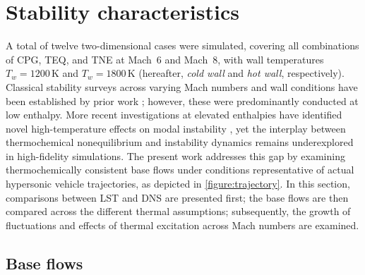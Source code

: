 \section{Stability characteristics}
A total of twelve two-dimensional cases were simulated, covering all combinations of \gls{CPG}, \gls{TEQ}, and \gls{TNE} at Mach~6 and Mach~8, with wall temperatures $T_w=1200\,\mathrm{K}$ and $T_w=1800\,\mathrm{K}$ (hereafter, \emph{cold wall} and \emph{hot wall}, respectively). Classical stability surveys across varying Mach numbers and wall conditions have been established by prior work \citep{Mack1969,Mack1984,Malik1989,MasadEtAl1992}; however, these were predominantly conducted at low enthalpy. More recent investigations at elevated enthalpies have identified novel high-temperature effects on modal instability \citep{Bitter2015}, yet the interplay between thermochemical nonequilibrium and instability dynamics remains underexplored in high-fidelity simulations. The present work addresses this gap by examining thermochemically consistent base flows under conditions representative of actual hypersonic vehicle trajectories, as depicted in \cref{figure:trajectory}. In this section, comparisons between \gls{LST} and \gls{DNS} are presented first; the base flows are then compared across the different thermal assumptions; subsequently, the growth of fluctuations and effects of thermal excitation across Mach numbers are examined.

\subsection{Base flows}

